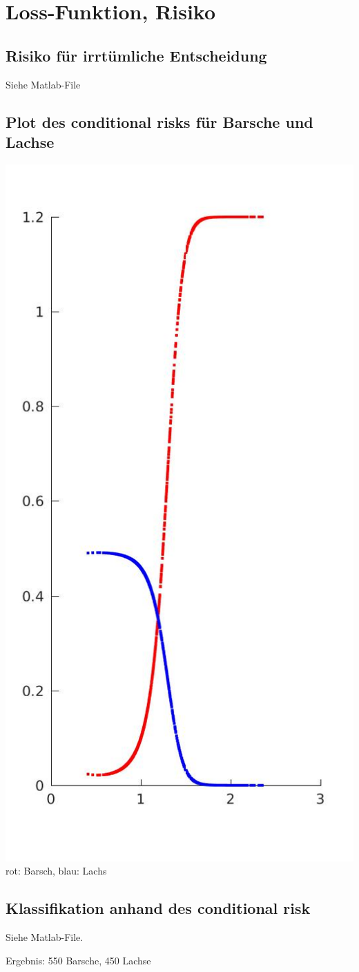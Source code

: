 \documentclass{scrartcl}
\begin{document}
\section{Loss-Funktion, Risiko}
\subsection{Risiko für irrtümliche Entscheidung}
Siehe Matlab-File

\subsection{Plot des conditional risks für Barsche und Lachse}

\includegraphics[width=.6\textwidth]{plots/3b_conditional_risk.jpg}\\
rot: Barsch, blau: Lachs
\subsection{Klassifikation anhand des conditional risk}
Siehe Matlab-File.

Ergebnis: 550 Barsche, 450 Lachse
\end{document}
